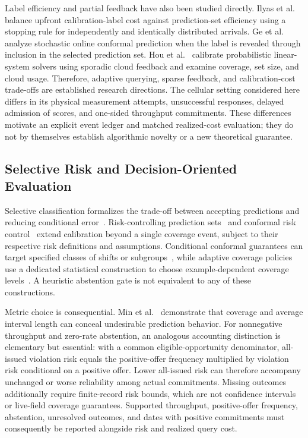 Label efficiency and partial feedback have also been studied directly. Ilyas et al.~\cite{ilyas2026} balance upfront calibration-label cost against prediction-set efficiency using a stopping rule for independently and identically distributed arrivals. Ge et al.~\cite{ge2025} analyze stochastic online conformal prediction when the label is revealed through inclusion in the selected prediction set. Hou et al.~\cite{hou2025} calibrate probabilistic linear-system solvers using sporadic cloud feedback and examine coverage, set size, and cloud usage. Therefore, adaptive querying, sparse feedback, and calibration-cost trade-offs are established research directions. The cellular setting considered here differs in its physical measurement attempts, unsuccessful responses, delayed admission of scores, and one-sided throughput commitments. These differences motivate an explicit event ledger and matched realized-cost evaluation; they do not by themselves establish algorithmic novelty or a new theoretical guarantee.

\subsection{Selective Risk and Decision-Oriented Evaluation}
Selective classification formalizes the trade-off between accepting predictions and reducing conditional error~\cite{geifman2017}. Risk-controlling prediction sets~\cite{bates2021} and conformal risk control~\cite{angelopoulos2024risk} extend calibration beyond a single coverage event, subject to their respective risk definitions and assumptions. Conditional conformal guarantees can target specified classes of shifts or subgroups~\cite{gibbs2025}, while adaptive coverage policies use a dedicated statistical construction to choose example-dependent coverage levels~\cite{gauthier2026}. A heuristic abstention gate is not equivalent to any of these constructions.

Metric choice is consequential. Min et al.~\cite{min2026} demonstrate that coverage and average interval length can conceal undesirable prediction behavior. For nonnegative throughput and zero-rate abstention, an analogous accounting distinction is elementary but essential: with a common eligible-opportunity denominator, all-issued violation risk equals the positive-offer frequency multiplied by violation risk conditional on a positive offer. Lower all-issued risk can therefore accompany unchanged or worse reliability among actual commitments. Missing outcomes additionally require finite-record risk bounds, which are not confidence intervals or live-field coverage guarantees. Supported throughput, positive-offer frequency, abstention, unresolved outcomes, and dates with positive commitments must consequently be reported alongside risk and realized query cost.

